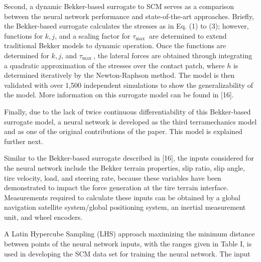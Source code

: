 \documentclass[10pt]{article}
\begin{document}
Second, a dynamic Bekker-based surrogate to SCM serves as a comparison between the neural network performance and state-of-the-art approaches. Briefly, the Bekker-based surrogate calculates the stresses as in Eq. (1) to (3); however, functions for $k, j$, and a scaling factor for $\tau_{\text {max }}$ are determined to extend traditional Bekker models to dynamic operation. Once the functions are determined for $k, j$, and $\tau_{\text {max }}$, the lateral forces are obtained through integrating a quadratic approximation of the stresses over the contact patch, where $h$ is determined iteratively by the Newton-Raphson method. The model is then validated with over 1,500 independent simulations to show the generalizability of the model. More information on this surrogate model can be found in [16].

Finally, due to the lack of twice continuous differentiability of this Bekker-based surrogate model, a neural network is developed as the third terramechanics model and as one of the original contributions of the paper. This model is explained further next.

Similar to the Bekker-based surrogate described in [16], the inputs considered for the neural network include the Bekker terrain properties, slip ratio, slip angle, tire velocity, load, and steering rate, because these variables have been demonstrated to impact the force generation at the tire terrain interface. Measurements required to calculate these inputs can be obtained by a global navigation satellite system/global positioning system, an inertial measurement unit, and wheel encoders.

A Latin Hypercube Sampling (LHS) approach maximizing the minimum distance between points of the neural network inputs, with the ranges given in Table I, is used in developing the SCM data set for training the neural network. The input
\end{document}
